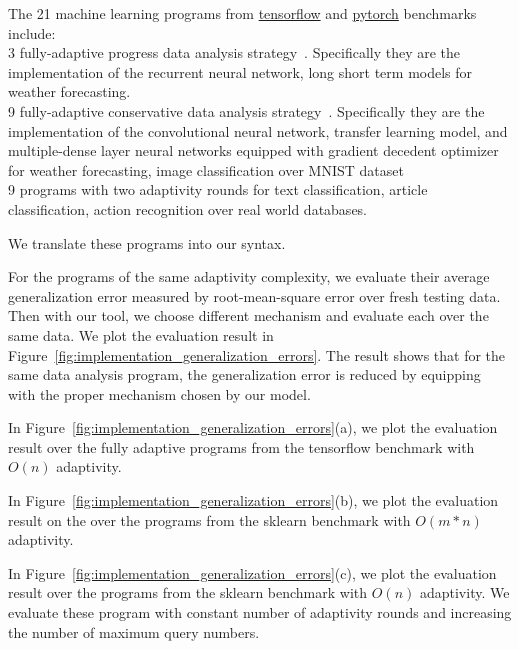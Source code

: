 The 21 machine learning programs
from \hyperlink{https://github.com/tensorflow/tensorflow/tree/master/tensorflow/examples}{tensorflow}
and \hyperlink{https://github.com/pytorch/pytorch}{pytorch}
benchmarks include:
\\
3 fully-adaptive progress data analysis
strategy~\cite{ZrnicH19}.
Specifically they are the implementation of the recurrent neural network, long short term models for 
weather forecasting.
\\
9
fully-adaptive conservative data analysis
strategy~\cite{ZrnicH19}.
Specifically they are the implementation of the convolutional neural network, transfer learning model,
and multiple-dense layer neural networks equipped with gradient decedent optimizer for
weather forecasting, image classification over MNIST dataset
\\
9 programs with two adaptivity rounds for text classification,
article classification, action recognition over real world databases.



We translate these programs into our syntax.

For the programs of the same adaptivity complexity, we evaluate their average generalization error measured by root-mean-square error over fresh testing data.
Then with our tool, we choose different mechanism and evaluate each over the same data.
We plot the evaluation result in Figure~\ref{fig:implementation_generalization_errors}.
The result shows that for the same data analysis program, the generalization error is reduced
by equipping with the proper mechanism chosen by our model.


In Figure~\ref{fig:implementation_generalization_errors}(a), we plot the 
evaluation result over the fully adaptive
programs from the tensorflow benchmark with $O(n)$ adaptivity.

In Figure~\ref{fig:implementation_generalization_errors}(b), we plot the 
evaluation result on the over the
programs from the sklearn benchmark with $O(m*n)$ adaptivity.

In Figure~\ref{fig:implementation_generalization_errors}(c), we plot the evaluation result over the
programs from the sklearn benchmark with $O(n)$ adaptivity.
We evaluate these program with constant number of adaptivity rounds and increasing the number of
maximum query numbers.


